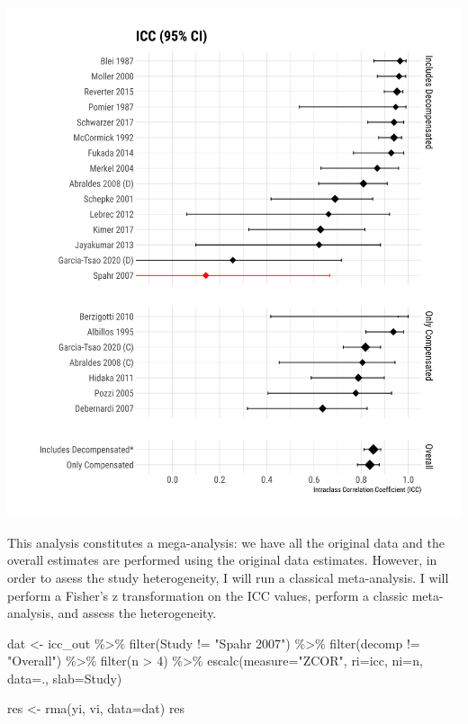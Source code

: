 \documentclass[
]{article}
\newenvironment{Shaded}{\begin{snugshade}}{\end{snugshade}}
\newcommand{\AttributeTok}[1]{\textcolor[rgb]{0.77,0.63,0.00}{#1}}
\newcommand{\DecValTok}[1]{\textcolor[rgb]{0.00,0.00,0.81}{#1}}
\newcommand{\FunctionTok}[1]{\textcolor[rgb]{0.00,0.00,0.00}{#1}}
\newcommand{\NormalTok}[1]{#1}
\newcommand{\OtherTok}[1]{\textcolor[rgb]{0.56,0.35,0.01}{#1}}
\newcommand{\SpecialCharTok}[1]{\textcolor[rgb]{0.00,0.00,0.00}{#1}}
\newcommand{\StringTok}[1]{\textcolor[rgb]{0.31,0.60,0.02}{#1}}
\begin{document}
\includegraphics{figures/icc_forest-1.png}

This analysis constitutes a mega-analysis: we have all the original data
and the overall estimates are performed using the original data
estimates. However, in order to asess the study heterogeneity, I will
run a classical meta-analysis. I will perform a Fisher's z
transformation on the ICC values, perform a classic meta-analysis, and
assess the heterogeneity.

\begin{Shaded}
\begin{Highlighting}[]
\NormalTok{dat }\OtherTok{\textless{}{-}}\NormalTok{ icc\_out }\SpecialCharTok{\%\textgreater{}\%} 
  \FunctionTok{filter}\NormalTok{(Study }\SpecialCharTok{!=} \StringTok{"Spahr 2007"}\NormalTok{) }\SpecialCharTok{\%\textgreater{}\%} 
  \FunctionTok{filter}\NormalTok{(decomp }\SpecialCharTok{!=} \StringTok{"Overall"}\NormalTok{) }\SpecialCharTok{\%\textgreater{}\%} 
  \FunctionTok{filter}\NormalTok{(n }\SpecialCharTok{\textgreater{}} \DecValTok{4}\NormalTok{) }\SpecialCharTok{\%\textgreater{}\%} 
  \FunctionTok{escalc}\NormalTok{(}\AttributeTok{measure=}\StringTok{"ZCOR"}\NormalTok{, }\AttributeTok{ri=}\NormalTok{icc, }\AttributeTok{ni=}\NormalTok{n, }\AttributeTok{data=}\NormalTok{., }\AttributeTok{slab=}\NormalTok{Study) }

\NormalTok{res }\OtherTok{\textless{}{-}} \FunctionTok{rma}\NormalTok{(yi, vi, }\AttributeTok{data=}\NormalTok{dat) }
\NormalTok{res }
\end{Highlighting}
\end{Shaded}
\end{document}
